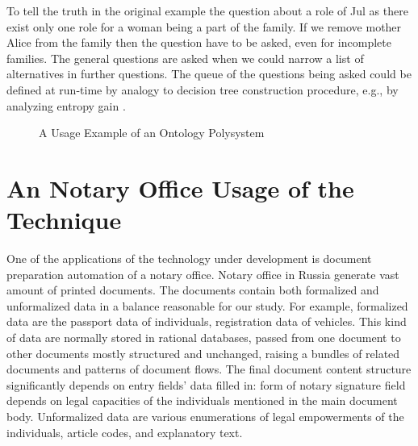 \documentclass[conference]{IEEEtran}
\begin{document}
To tell the truth in the original example the question about a role of
Jul as there exist only one role for a woman being a part of the
family.  If we remove mother Alice from the family then the question
have to be asked, even for incomplete families.  The general questions
are asked when we could narrow a list of alternatives in further
questions.  The queue of the questions being asked could be defined at
run-time by analogy to decision tree construction procedure, e.g., by
analyzing entropy gain \cite{dectrees}.

\begin{figure}
\centering\footnotesize\sf
\def\svgwidth{0.9\linewidth}

\caption{A Usage Example of an Ontology Polysystem}
\label{OPSA}
\end{figure}









\section{An Notary Office Usage of the Technique}

One of the applications of the technology under development is
document preparation automation of a notary office.  Notary office in
Russia generate vast amount of printed documents.  The documents
contain both formalized and unformalized data in a balance reasonable
for our study.  For example, formalized data are the passport data of
individuals, registration data of vehicles.  This kind of data are
normally stored in rational databases, passed from one document to
other documents mostly structured and unchanged, raising a bundles of
related documents and patterns of document flows.  The final document
content structure significantly depends on entry fields’ data filled
in: form of notary signature field depends on legal capacities of the
individuals mentioned in the main document body.
Unformalized data are various enumerations of legal empowerments of
the individuals, article codes, and explanatory text.
\end{document}
